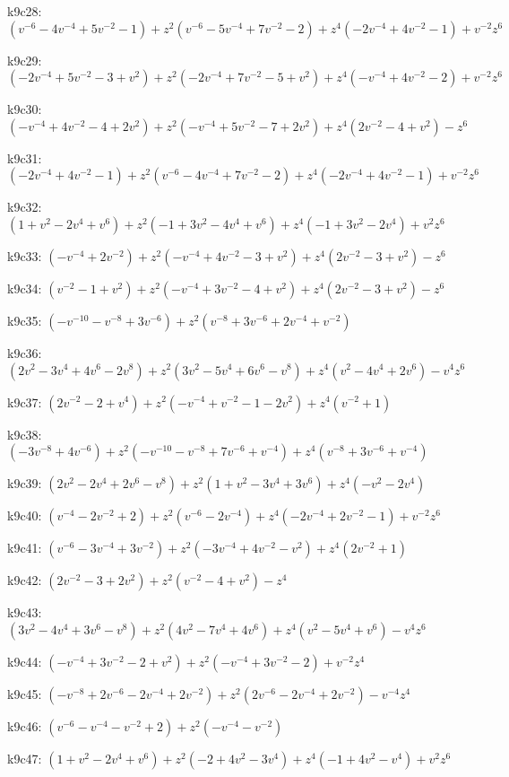 k9c28: $ (v^{-6}-4v^{-4}+5v^{-2}-1)  +z^{2}(v^{-6}-5v^{-4}+7v^{-2}-2)  +z^{4}(-2v^{-4}+4v^{-2}-1)  +v^{-2}z^{6} $ 

k9c29: $ (-2v^{-4}+5v^{-2}-3+v^{2})  +z^{2}(-2v^{-4}+7v^{-2}-5+v^{2})  +z^{4}(-v^{-4}+4v^{-2}-2)  +v^{-2}z^{6} $ 

k9c30: $ (-v^{-4}+4v^{-2}-4+2v^{2})  +z^{2}(-v^{-4}+5v^{-2}-7+2v^{2})  +z^{4}(2v^{-2}-4+v^{2})  -z^{6} $ 

k9c31: $ (-2v^{-4}+4v^{-2}-1)  +z^{2}(v^{-6}-4v^{-4}+7v^{-2}-2)  +z^{4}(-2v^{-4}+4v^{-2}-1)  +v^{-2}z^{6} $ 

k9c32: $ (1+v^{2}-2v^{4}+v^{6})  +z^{2}(-1+3v^{2}-4v^{4}+v^{6})  +z^{4}(-1+3v^{2}-2v^{4})  +v^{2}z^{6} $ 

k9c33: $ (-v^{-4}+2v^{-2})  +z^{2}(-v^{-4}+4v^{-2}-3+v^{2})  +z^{4}(2v^{-2}-3+v^{2})  -z^{6} $ 

k9c34: $ (v^{-2}-1+v^{2})  +z^{2}(-v^{-4}+3v^{-2}-4+v^{2})  +z^{4}(2v^{-2}-3+v^{2})  -z^{6} $ 

k9c35: $ (-v^{-10}-v^{-8}+3v^{-6})  +z^{2}(v^{-8}+3v^{-6}+2v^{-4}+v^{-2}) $ 

k9c36: $ (2v^{2}-3v^{4}+4v^{6}-2v^{8})  +z^{2}(3v^{2}-5v^{4}+6v^{6}-v^{8})  +z^{4}(v^{2}-4v^{4}+2v^{6})  -v^{4}z^{6} $ 

k9c37: $ (2v^{-2}-2+v^{4})  +z^{2}(-v^{-4}+v^{-2}-1-2v^{2})  +z^{4}(v^{-2}+1) $ 

k9c38: $ (-3v^{-8}+4v^{-6})  +z^{2}(-v^{-10}-v^{-8}+7v^{-6}+v^{-4})  +z^{4}(v^{-8}+3v^{-6}+v^{-4}) $ 

k9c39: $ (2v^{2}-2v^{4}+2v^{6}-v^{8})  +z^{2}(1+v^{2}-3v^{4}+3v^{6})  +z^{4}(-v^{2}-2v^{4}) $ 

k9c40: $ (v^{-4}-2v^{-2}+2)  +z^{2}(v^{-6}-2v^{-4})  +z^{4}(-2v^{-4}+2v^{-2}-1)  +v^{-2}z^{6} $ 

k9c41: $ (v^{-6}-3v^{-4}+3v^{-2})  +z^{2}(-3v^{-4}+4v^{-2}-v^{2})  +z^{4}(2v^{-2}+1) $ 

k9c42: $ (2v^{-2}-3+2v^{2})  +z^{2}(v^{-2}-4+v^{2})  -z^{4} $ 

k9c43: $ (3v^{2}-4v^{4}+3v^{6}-v^{8})  +z^{2}(4v^{2}-7v^{4}+4v^{6})  +z^{4}(v^{2}-5v^{4}+v^{6})  -v^{4}z^{6} $ 

k9c44: $ (-v^{-4}+3v^{-2}-2+v^{2})  +z^{2}(-v^{-4}+3v^{-2}-2)  +v^{-2}z^{4} $ 

k9c45: $ (-v^{-8}+2v^{-6}-2v^{-4}+2v^{-2})  +z^{2}(2v^{-6}-2v^{-4}+2v^{-2})  -v^{-4}z^{4} $ 

k9c46: $ (v^{-6}-v^{-4}-v^{-2}+2)  +z^{2}(-v^{-4}-v^{-2}) $ 

k9c47: $ (1+v^{2}-2v^{4}+v^{6})  +z^{2}(-2+4v^{2}-3v^{4})  +z^{4}(-1+4v^{2}-v^{4})  +v^{2}z^{6} $ 

